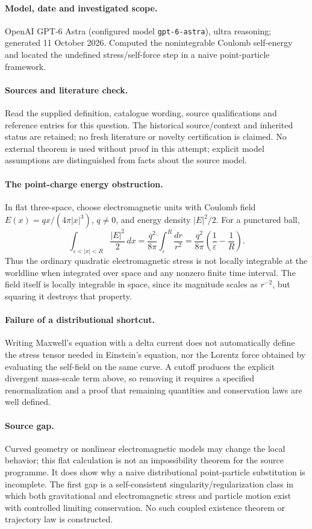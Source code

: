 \documentclass[11pt]{article}
\begin{document}
\paragraph{Model, date and investigated scope.}
OpenAI GPT-6 Astra (configured model \texttt{gpt-6-astra}), ultra reasoning; generated 11 October 2026. Computed the nonintegrable Coulomb self-energy and located the undefined stress/self-force step in a naive point-particle framework.

\paragraph{Sources and literature check.}
Read the supplied definition, catalogue wording, source qualifications and reference entries for this question. The historical source/context and inherited status are retained; no fresh literature or novelty certification is claimed. No external theorem is used without proof in this attempt; explicit model assumptions are distinguished from facts about the source model.

\paragraph{The point-charge energy obstruction.} In flat three-space, choose electromagnetic units with Coulomb field \(E(x)=q x/(4\pi|x|^3)\), \(q\ne0\), and energy density \(|E|^2/2\). For a punctured ball,
\[
 \int_{\varepsilon<|x|<R}\frac{|E|^2}{2}\,dx
 =\frac{q^2}{8\pi}\int_\varepsilon^R\frac{dr}{r^2}
 =\frac{q^2}{8\pi}\left(\frac1\varepsilon-\frac1R\right).
\]
Thus the ordinary quadratic electromagnetic stress is not locally integrable at the worldline when integrated over space and any nonzero finite time interval. The field itself is locally integrable in space, since its magnitude scales as \(r^{-2}\), but squaring it destroys that property.
\paragraph{Failure of a distributional shortcut.} Writing Maxwell's equation with a delta current does not automatically define the stress tensor needed in Einstein's equation, nor the Lorentz force obtained by evaluating the self-field on the same curve. A cutoff produces the explicit divergent mass-scale term above, so removing it requires a specified renormalization and a proof that remaining quantities and conservation laws are well defined.
\paragraph{Source gap.} Curved geometry or nonlinear electromagnetic models may change the local behavior; this flat calculation is not an impossibility theorem for the source programme. It does show why a naive distributional point-particle substitution is incomplete. The first gap is a self-consistent singularity/regularization class in which both gravitational and electromagnetic stress and particle motion exist with controlled limiting conservation. No such coupled existence theorem or trajectory law is constructed.
\end{document}
